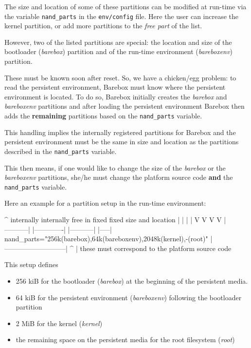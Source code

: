 The size and location of some of these partitions can be modified at run-time
via the variable \texttt{nand\_parts} in the \texttt{env/config} file. Here the
user can increase the kernel partition, or add more partitions to the
\textit{free part} of the list.

However, two of the listed partitions are special: the location and size of
the bootloader (\textit{barebox}) partition and of the run-time environment
(\textit{bareboxenv}) partition.
%
%
%

These must be known soon after reset. So, we have a chicken/egg problem: to
read the persistent environment, Barebox must know where the persistent environment
is located. To do so, Barebox initially creates the \textit{barebox} and
\textit{bareboxenv} partitions and after loading the persistent environment
Barebox then adds the \textbf{remaining} partitions based on the
\texttt{nand\_parts} variable.

This handling implies the internally registered partitions for Barebox and the
persistent environment must be the same in size and location as the partitions
described in the \texttt{nand\_parts} variable.

This then means, if one would like to change the size of the \textit{barebox}
or the \textit{bareboxenv} partitions, she/he must change the platform source
code \textbf{and} the \texttt{nand\_parts} variable.

Here an example for a partition setup in the run-time environment:

\begin{ptxshell}[escapechar=|]{^}
              internally    internally            free in
               fixed          fixed           size and location
                 |              |              |           |
                 V              V              V           V
            |-----------| |-------------| |-----------| |-----|
nand_parts="256k(barebox),64k(bareboxenv),2048k(kernel),-(root)"
            |---------------------------|
                        ^
                        |
              these must correspond to
              the platform source code
\end{ptxshell}

This setup defines

\begin{itemize}
 \item 256 kiB for the bootloader (\textit{barebox}) at the beginning of the
  persistent media.
 \item 64 kiB for the persistent environment (\textit{bareboxenv}) following
  the bootloader partition
 \item 2 MiB for the kernel (\textit{kernel})
 \item the remaining space on the persistent media for the root filesystem
  (\textit{root})
\end{itemize}

